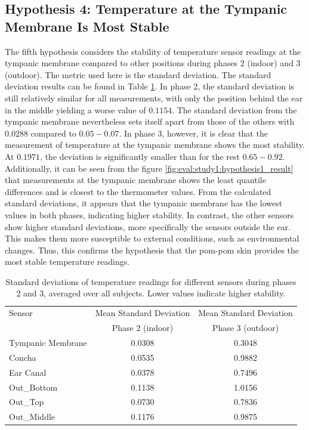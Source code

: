 \subsection{Hypothesis 4: Temperature at the Tympanic Membrane Is Most Stable}
\label{subsec:Evaluation:Study1:Hypothesis4}
The fifth hypothesis considers the stability of temperature sensor readings at the tympanic membrane compared to other positions during phases 2 (indoor) and 3 (outdoor).
The metric used here is the standard deviation. 
The standard deviation results can be found in Table \ref{subsec:Evaluation:Study1:Hypothesis4:std_dev_table}. 
In phase 2, the standard deviation is still relatively similar for all measurements, with only the position behind the ear in the middle yielding a worse value of $0.1154$. 
The standard deviation from the tympanic membrane nevertheless sets itself apart from those of the others with $0.0288$ compared to $0.05-0.07$. 
In phase 3, however, it is clear that the measurement of temperature at the tympanic membrane shows the most stability. 
At $0.1971$, the deviation is significantly smaller than for the rest $0.65-0.92$. 
Additionally, it can be seen from the figure \ref{fig:eval:study1:hypothesis1_result} that measurements at the tympanic membrane shows the least quantile differences and is closest to the thermometer values. 
From the calculated standard deviations, it appears that the tympanic membrane has the lowest values in both phases, indicating higher stability. 
In contrast, the other sensors show higher standard deviations, more specifically the sensors outside the ear. 
This makes them more susceptible to external conditions, such as environmental changes.
Thus, this confirms the hypothesis that the pom-pom skin provides the most stable temperature readings.

\begin{table}[t]
\centering
\begin{tabular}{|l|c|c|}
\hline
Sensor & Mean Standard Deviation & Mean Standard Deviation \\
& Phase 2 (indoor) & Phase 3 (outdoor) \\
\hline
Tympanic Membrane & 0.0308 & 0.3048 \\
Concha & 0.0535 & 0.9882 \\
Ear Canal & 0.0378 & 0.7496 \\
Out\_Bottom & 0.1138 & 1.0156 \\
Out\_Top & 0.0730 & 0.7836 \\
Out\_Middle & 0.1176 & 0.9875 \\
\hline
\end{tabular}
\caption{Standard deviations of temperature readings for different sensors during phases 2 and 3, averaged over all subjects. Lower values indicate higher stability.}
\label{subsec:Evaluation:Study1:Hypothesis4:std_dev_table}
\end{table}

